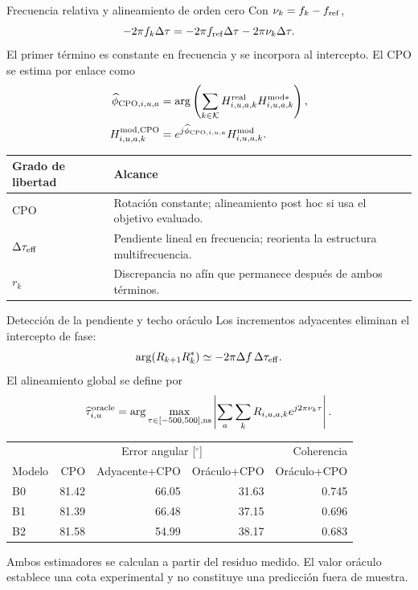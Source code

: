 \documentclass[10pt,aspectratio=169]{beamer}
\begin{document}
\begin{frame}{Frecuencia relativa y alineamiento de orden cero}
\small
Con $\nu_k=f_k-f_{\rm ref}$,
\begin{equation*}
-2\pi f_k\Delta\tau=-2\pi f_{\rm ref}\Delta\tau-2\pi\nu_k\Delta\tau.
\end{equation*}
El primer término es constante en frecuencia y se incorpora al intercepto. El CPO se
estima por enlace como
\begin{align*}
\widehat\phi_{{\rm CPO},i,u,a}
&=\arg\left(\sum_{k\in\mathcal K}
H^{\rm real}_{i,u,a,k}H^{{\rm mod}*}_{i,u,a,k}\right),\\
H^{{\rm mod,CPO}}_{i,u,a,k}
&=e^{j\widehat\phi_{{\rm CPO},i,u,a}}H^{\rm mod}_{i,u,a,k}.
\end{align*}
\begin{tabularx}{\textwidth}{p{3.0cm}Y}
\toprule
Grado de libertad & Alcance\\
\midrule
CPO & Rotación constante; alineamiento post hoc si usa el objetivo evaluado.\\
$\Delta\tau_{\rm eff}$ & Pendiente lineal en frecuencia; reorienta la estructura multifrecuencia.\\
$r_k$ & Discrepancia no afín que permanece después de ambos términos.\\
\bottomrule
\end{tabularx}
\end{frame}

\begin{frame}{Detección de la pendiente y techo oráculo}
\small
Los incrementos adyacentes eliminan el intercepto de fase:
\begin{equation*}
\arg(R_{k+1}R_k^*)\simeq-2\pi\Delta f\,\Delta\tau_{\rm eff}.
\end{equation*}
El alineamiento global se define por
\begin{equation*}
\widehat\tau^{\rm oracle}_{i,u}=
\arg\max_{\tau\in[-500,500],{\rm ns}}
\left|\sum_a\sum_k R_{i,u,a,k}e^{j2\pi\nu_k\tau}\right|.
\end{equation*}
\begin{table}
\centering
\begin{tabular}{lrrrr}
\toprule
& \multicolumn{3}{c}{Error angular [$^\circ$]} & Coherencia\\
\cmidrule(lr){2-4}\cmidrule(lr){5-5}
Modelo & CPO & Adyacente+CPO & Oráculo+CPO & Oráculo+CPO\\
\midrule
B0 & 81.42 & 66.05 & 31.63 & 0.745\\
B1 & 81.39 & 66.48 & 37.15 & 0.696\\
B2 & 81.58 & 54.99 & 38.17 & 0.683\\
\bottomrule
\end{tabular}
\end{table}
\scriptsize Ambos estimadores se calculan a partir del residuo medido. El valor oráculo
establece una cota experimental y no constituye una predicción fuera de muestra.
\end{frame}
\end{document}
